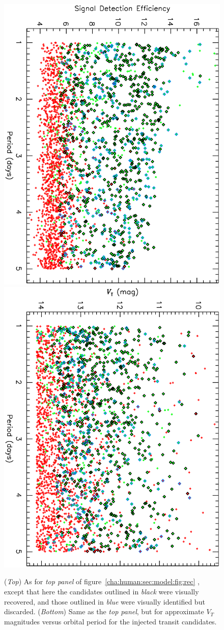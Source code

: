 \begin{figure}
\begin{center}
\centering
\includegraphics[width=.55\textwidth, angle=90]{7_visual_b} \\
\includegraphics[width=.55\textwidth, angle=90]{7_visual_a} \\
\caption[SDE and $V_{T}$ versus period for visually recovered transits]{%
({\it Top}) As for {\it top panel} of figure~\ref{cha:human:sec:model:fig:rec}%
, except that here the candidates outlined in {\it black} were visually recovered, and those outlined in {\it blue} were visually identified but discarded.
({\it Bottom}) Same as the {\it top panel}, but for approximate $V_{T}$ magnitudes versus orbital period for the injected transit candidates.%
}
\label{cha:human:sec:model:fig:visrec}
\end{center}
\end{figure}

